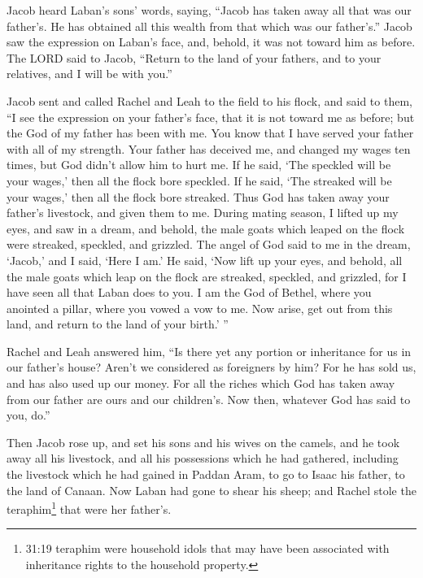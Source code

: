 \mychapter{}
\myverse*{}Jacob heard Laban’s sons’ words, saying, “Jacob has taken away all that was our father’s. He has obtained all this wealth from that which was our father’s.”  \myverse{}Jacob saw the expression on Laban’s face, and, behold, it was not toward him as before.  \myverse{}The LORD said to Jacob, “Return to the land of your fathers, and to your relatives, and I will be with you.”

\myverse{}Jacob sent and called Rachel and Leah to the field to his flock,  \myverse{}and said to them, “I see the expression on your father’s face, that it is not toward me as before; but the God of my father has been with me.  \myverse{}You know that I have served your father with all of my strength.  \myverse{}Your father has deceived me, and changed my wages ten times, but God didn’t allow him to hurt me.  \myverse{} If he said, ‘The speckled will be your wages,’ then all the flock bore speckled. If he said, ‘The streaked will be your wages,’ then all the flock bore streaked.  \myverse{}Thus God has taken away your father’s livestock, and given them to me.  \myverse{}During mating season, I lifted up my eyes, and saw in a dream, and behold, the male goats which leaped on the flock were streaked, speckled, and grizzled.  \myverse{}The angel of God said to me in the dream, ‘Jacob,’ and I said, ‘Here I am.’  \myverse{}He said, ‘Now lift up your eyes, and behold, all the male goats which leap on the flock are streaked, speckled, and grizzled, for I have seen all that Laban does to you.  \myverse{}I am the God of Bethel, where you anointed a pillar, where you vowed a vow to me. Now arise, get out from this land, and return to the land of your birth.’ ”

\myverse{}Rachel and Leah answered him, “Is there yet any portion or inheritance for us in our father’s house?  \myverse{}Aren’t we considered as foreigners by him? For he has sold us, and has also used up our money.  \myverse{}For all the riches which God has taken away from our father are ours and our children’s. Now then, whatever God has said to you, do.”

\myverse{}Then Jacob rose up, and set his sons and his wives on the camels,  \myverse{}and he took away all his livestock, and all his possessions which he had gathered, including the livestock which he had gained in Paddan Aram, to go to Isaac his father, to the land of Canaan.  \myverse{}Now Laban had gone to shear his sheep; and Rachel stole the teraphim\footnote{31:19 teraphim were household idols that may have been associated with inheritance rights to the household property.} that were her father’s.


